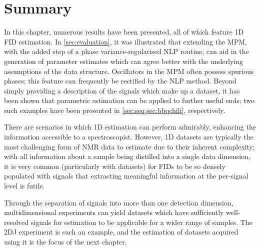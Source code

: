 \section{Summary}

In this chapter, numerous results have been presented, all of which feature
\ac{1D} \ac{FID} estimation.
In \cref{sec:evaluation}, it was illustrated that extending the \ac{MPM}, with
the added step of a phase variance-regularised \ac{NLP} routine, can
aid in the generation of parameter estimates which can agree better with the
underlying assumptions of the data structure. Oscillators in the \ac{MPM} often
possess spurious phases; this feature can frequently be rectified by the
\ac{NLP} method. Beyond simply providing a description of the signals which
make up a dataset, it has been shown that parametric estimation can be applied
to further useful ends; two such examples have been presented in
\cref{sec:seq,sec:bbqchili}, respectively.

There are scenarios in which \ac{1D} estimation can perform admirably,
enhancing the information accessible to a spectroscopist. However,
\ac{1D} datasets are typically the most challenging form of \ac{NMR} data to
estimate due to their inherent complexity; with all information about a
sample being distilled into a single data dimension, it is very common
(particularly with  datasets) for \acp{FID} to be so densely
populated with signals that extracting meaningful information at
the per-signal level is futile.
\label{corr:limited-scope}

Through the separation of signals into more than one detection dimension,
multidimensional experiments can yield datasets which have sufficiently
well-resolved signals for estimation to be applicable for a wider range of
samples. The \ac{2DJ} experiment is such an example, and the estimation of
datasets acquired using it is the focus of the next chapter.
